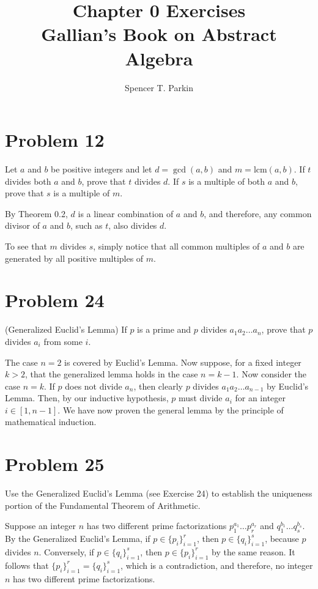 \documentclass[12pt]{article}
\title{Chapter 0 Exercises\\Gallian's Book on Abstract Algebra}
\author{Spencer T. Parkin}
\newcommand{\lcm}{\mbox{lcm}}
\begin{document}
\maketitle

\section*{Problem 12}

Let $a$ and $b$ be positive integers and let $d=\gcd(a,b)$ and $m=\lcm(a,b)$.
If $t$ divides both $a$ and $b$, prove that $t$ divides $d$.  If $s$ is a multiple of
both $a$ and $b$, prove that $s$ is a multiple of $m$.

By Theorem 0.2, $d$ is a linear combination of $a$ and $b$, and therefore,
any common divisor of $a$ and $b$, such as $t$, also divides $d$.

To see that $m$ divides $s$, simply notice that all common multiples
of $a$ and $b$ are generated by all positive multiples of $m$.

\section*{Problem 24}

(Generalized Euclid's Lemma)  If $p$ is a prime and $p$ divides
$a_1a_2\dots a_n$, prove that $p$ divides $a_i$ from some $i$.

The case $n=2$ is covered by Euclid's Lemma.  Now suppose, for a fixed integer
$k>2$, that the generalized lemma holds in the case $n=k-1$.  Now
consider the case $n=k$.  If $p$ does not divide $a_n$, then
clearly $p$ divides $a_1a_2\dots a_{n-1}$ by Euclid's Lemma.
Then, by our inductive hypothesis, $p$ must divide $a_i$ for an
integer $i\in[1,n-1]$.  We have now proven the general lemma
by the principle of mathematical induction.

\section*{Problem 25}

Use the Generalized Euclid's Lemma (see Exercise 24) to establish the
uniqueness portion of the Fundamental Theorem of Arithmetic.

Suppose an integer $n$ has two different prime factorizations $p_1^{a_1}\dots p_r^{a_r}$
and $q_1^{b_1}\dots q_s^{b_s}$.  By the Generalized Euclid's Lemma, if
$p\in\{p_i\}_{i=1}^r$, then $p\in\{q_i\}_{i=1}^s$, because $p$ divides $n$.
Conversely, if $p\in\{q_i\}_{i=1}^s$, then $p\in\{p_i\}_{i=1}^r$ by the same reason.
It follows that $\{p_i\}_{i=1}^r=\{q_i\}_{i=1}^s$, which is a contradiction, and
therefore, no integer $n$ has two different prime factorizations.
\end{document}
